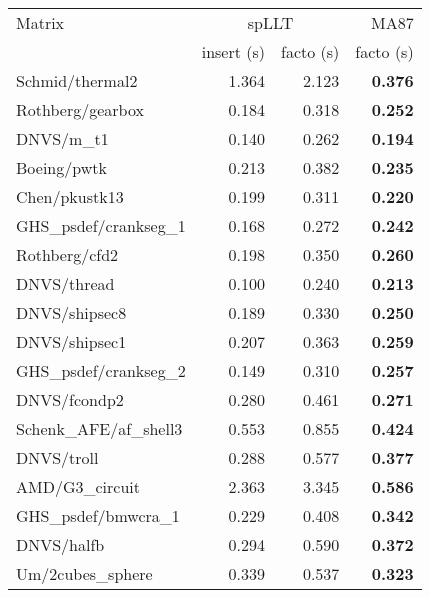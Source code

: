 \begin{tabular}{l|rr|r}
  \hline
  Matrix                          & \multicolumn{2}{c}{spLLT} & MA87                   \\
  \cline{2-4}
                                  & insert (s)                & facto (s) & facto (s)  \\
  \hline
  Schmid/thermal2                 & 1.364                     & 2.123     & \bf 0.376  \\
  Rothberg/gearbox                & 0.184                     & 0.318     & \bf 0.252  \\
  DNVS/m\_t1                      & 0.140                     & 0.262     & \bf 0.194  \\
  Boeing/pwtk                     & 0.213                     & 0.382     & \bf 0.235  \\
  Chen/pkustk13                   & 0.199                     & 0.311     & \bf 0.220  \\
  GHS\_psdef/crankseg\_1          & 0.168                     & 0.272     & \bf 0.242  \\
  Rothberg/cfd2                   & 0.198                     & 0.350     & \bf 0.260  \\
  DNVS/thread                     & 0.100                     & 0.240     & \bf 0.213  \\
  DNVS/shipsec8                   & 0.189                     & 0.330     & \bf 0.250  \\
  DNVS/shipsec1                   & 0.207                     & 0.363     & \bf 0.259  \\
  GHS\_psdef/crankseg\_2          & 0.149                     & 0.310     & \bf 0.257  \\
  DNVS/fcondp2                    & 0.280                     & 0.461     & \bf 0.271  \\
  Schenk\_AFE/af\_shell3          & 0.553                     & 0.855     & \bf 0.424  \\
  DNVS/troll                      & 0.288                     & 0.577     & \bf 0.377  \\
  AMD/G3\_circuit                 & 2.363                     & 3.345     & \bf 0.586  \\
  GHS\_psdef/bmwcra\_1            & 0.229                     & 0.408     & \bf 0.342  \\
  DNVS/halfb                      & 0.294                     & 0.590     & \bf 0.372  \\
  Um/2cubes\_sphere               & 0.339                     & 0.537     & \bf 0.323  \\

\end{tabular}
